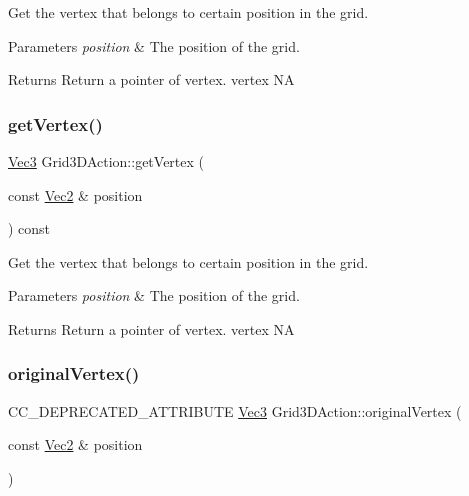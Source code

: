 Get the vertex that belongs to certain position in the grid. 


\begin{DoxyParams}{Parameters}
{\em position} & The position of the grid. \\
\hline
\end{DoxyParams}
\begin{DoxyReturn}{Returns}
Return a pointer of vertex.  vertex  NA 
\end{DoxyReturn}
\mbox{\label{classGrid3DAction_a188dfc79a323f07b3aff441bced64201}} 
\subsubsection{\texorpdfstring{get\+Vertex()}{getVertex()}\hspace{0.1cm}{\footnotesize\ttfamily [2/2]}}
{\footnotesize\ttfamily \hyperlink{classVec3}{Vec3} Grid3\+D\+Action\+::get\+Vertex (\begin{DoxyParamCaption}\item[{const \hyperlink{classVec2}{Vec2} \&}]{position }\end{DoxyParamCaption}) const}



Get the vertex that belongs to certain position in the grid. 


\begin{DoxyParams}{Parameters}
{\em position} & The position of the grid. \\
\hline
\end{DoxyParams}
\begin{DoxyReturn}{Returns}
Return a pointer of vertex.  vertex  NA 
\end{DoxyReturn}
\mbox{\label{classGrid3DAction_aa9ab3e0d2e07ab0a8227bbbd9c0b2021}} 
\subsubsection{\texorpdfstring{original\+Vertex()}{originalVertex()}\hspace{0.1cm}{\footnotesize\ttfamily [1/2]}}
{\footnotesize\ttfamily C\+C\+\_\+\+D\+E\+P\+R\+E\+C\+A\+T\+E\+D\+\_\+\+A\+T\+T\+R\+I\+B\+U\+TE \hyperlink{classVec3}{Vec3} Grid3\+D\+Action\+::original\+Vertex (\begin{DoxyParamCaption}\item[{const \hyperlink{classVec2}{Vec2} \&}]{position }\end{DoxyParamCaption})\hspace{0.3cm}{\ttfamily [inline]}}

